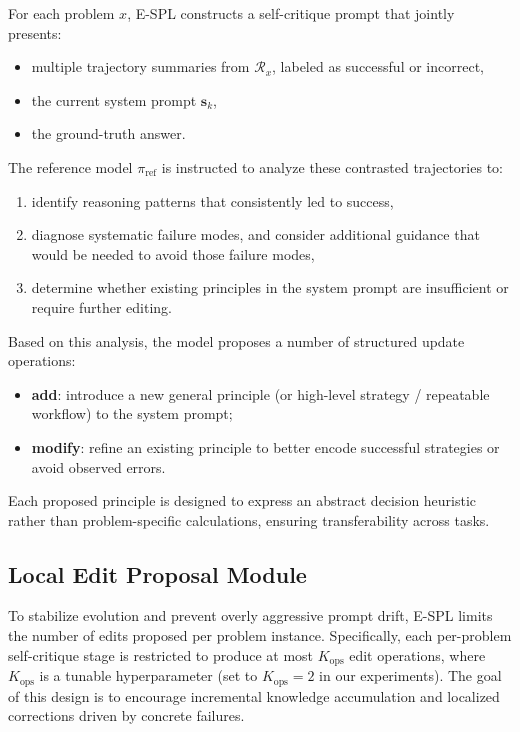 \documentclass{article}
\theoremstyle{plain}
\theoremstyle{definition}
\theoremstyle{remark}
\begin{document}
For each problem $x$, E-SPL constructs a self-critique prompt that jointly presents:
\vspace{-5pt}
\begin{itemize}
    \item multiple trajectory summaries from $\mathcal{R}_x$, labeled as successful or incorrect,
    \item the current system prompt $\mathbf{s}_k$,
    \item the ground-truth answer.
\end{itemize}
The reference model $\pi_{\text{ref}}$ is instructed to analyze these contrasted trajectories to:
\vspace{-5pt}
\begin{enumerate}
    \item identify reasoning patterns that consistently led to success,
    \item diagnose systematic failure modes, and consider additional guidance that would be needed to avoid those failure modes,
    \item determine whether existing principles in the system prompt are insufficient or require further editing.
\end{enumerate}
Based on this analysis, the model proposes a number of structured update operations:
\begin{itemize}
    \item \textbf{add}: introduce a new general principle (or high-level strategy / repeatable workflow) to the system prompt;
    \item \textbf{modify}: refine an existing principle to better encode successful strategies or avoid observed errors.
\end{itemize}
Each proposed principle is designed to express an abstract decision heuristic rather than problem-specific calculations, ensuring transferability across tasks.

\subsection{Local Edit Proposal Module}
\label{sec:appendix-max-ops}

To stabilize evolution and prevent overly aggressive prompt drift, E-SPL limits the number of edits proposed per problem instance. Specifically, each per-problem self-critique stage is restricted to produce at most $K_{\text{ops}}$ edit operations, where $K_{\text{ops}}$ is a tunable hyperparameter (set to $K_{\text{ops}}=2$ in our experiments). The goal of this design is to encourage incremental knowledge accumulation and localized corrections driven by concrete failures.
\end{document}
